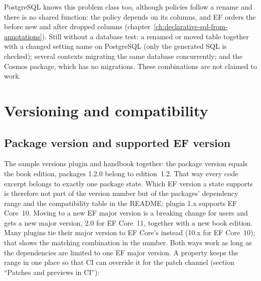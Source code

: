PostgreSQL knows this problem class too, although policies follow a rename and there is no
shared function: the policy depends on its columns, and EF orders the
 before new and after dropped columns
(chapter~\ref{ch:declarative-sql-from-annotations}). Still without a database test: a renamed or
moved table together with a changed setting name on PostgreSQL (only the generated SQL is
checked); several contexts migrating the same database concurrently; and the Cosmos package,
which has no migrations. These combinations are not claimed to work.

\chapter{Versioning and compatibility}\label{ch:versioning-and-compatibility}

\section{Package version and supported EF version}

The sample versions plugin and handbook together: the package version equals the book
edition, packages 1.2.0 belong to edition~1.2. That way every code excerpt belongs to exactly
one package state. Which EF version a state supports is therefore not part of the version
number but of the packages' dependency range and the compatibility table in the README: plugin
1.x supports EF Core~10. Moving to a new EF major version is a breaking change for users and
gets a new major version, 2.0 for EF Core~11, together with a new book edition. Many plugins
tie their major version to EF Core's instead (10.x for EF Core~10); that shows the matching
combination in the number. Both ways work as long as the dependencies are limited to one EF
major version. A property keeps the range in one place so that CI can override it for the
patch channel (section “Patches and previews in CI”):

\begin{sourcecode}[Directory.\allowbreak{}Packages.\allowbreak{}props (\allowbreak{}excerpt)]{xml}
<PropertyGroup>
  <EFCoreVersion Condition="'$(EFCoreVersion)' == ''">[10.0.0,11.0.0)</EFCoreVersion>
  <CentralPackageFloatingVersionsEnabled>true</CentralPackageFloatingVersionsEnabled>
</PropertyGroup>
<PackageVersion Include="Microsoft.EntityFrameworkCore" Version="$(EFCoreVersion)" />
<PackageVersion Include="Npgsql.EntityFrameworkCore.PostgreSQL" Version="$(EFCoreVersion)" />
\end{sourcecode}

